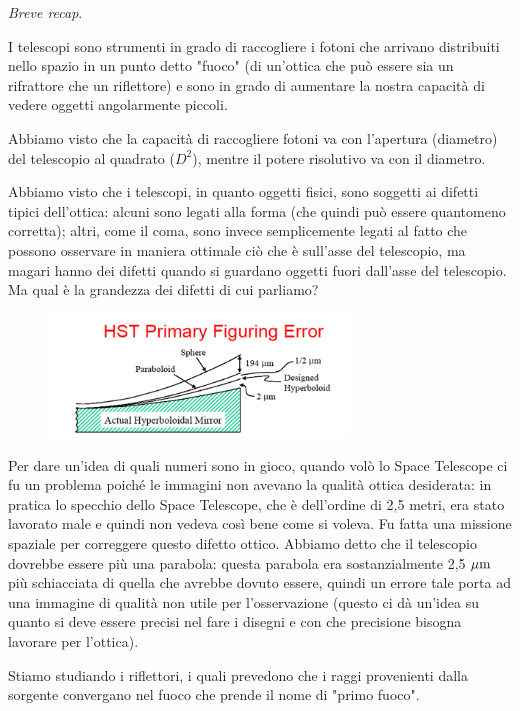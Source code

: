 \textit{Breve recap}.

I telescopi sono strumenti in grado di raccogliere i fotoni che arrivano distribuiti nello spazio in un punto detto "fuoco" (di un'ottica che può essere sia un rifrattore che un riflettore) e sono in grado di aumentare la nostra capacità di vedere oggetti angolarmente piccoli.

Abbiamo visto che la capacità di raccogliere fotoni va con l'apertura (diametro) del telescopio al quadrato ($D^2$), mentre il potere risolutivo va con il diametro.

Abbiamo visto che i telescopi, in quanto oggetti fisici, sono soggetti ai difetti tipici dell'ottica: alcuni sono legati alla forma (che quindi può essere quantomeno corretta); altri, come il coma, sono invece semplicemente legati al fatto che possono osservare in maniera ottimale ciò che è sull'asse del telescopio, ma magari hanno dei difetti quando si guardano oggetti fuori dall'asse del telescopio. Ma qual è la grandezza dei difetti di cui parliamo?

\begin{figure}[H]
    \centering
    \includegraphics[width=8cm]{immagini/errore_space_telescope.png}
\end{figure}

Per dare un'idea di quali numeri sono in gioco, quando volò lo Space Telescope ci fu un problema poiché le immagini non avevano la qualità ottica desiderata: in pratica lo specchio dello Space Telescope, che è dell'ordine di 2,5 metri, era stato lavorato male e quindi non vedeva così bene come si voleva. Fu fatta una missione spaziale per correggere questo difetto ottico. Abbiamo detto che il telescopio dovrebbe essere più una parabola: questa parabola era sostanzialmente 2,5 $\rm \mu m$ più schiacciata di quella che avrebbe dovuto essere, quindi un errore tale porta ad una immagine di qualità non utile per l'osservazione (questo ci dà un'idea su quanto si deve essere precisi nel fare i disegni e con che precisione bisogna lavorare per l'ottica).

\vspace{0.2cm}Stiamo studiando i riflettori, i quali prevedono che i raggi provenienti dalla sorgente convergano nel fuoco che prende il nome di "primo fuoco".


